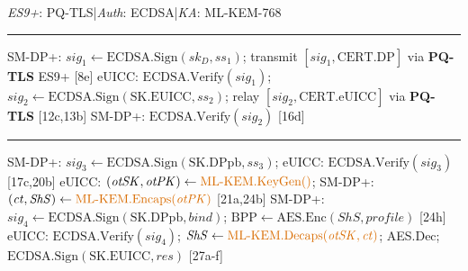 \documentclass[a4paper,fleqn]{cas-sc}
\begin{document}
\begin{algorithm}[H]
\caption{Config (c): ML-KEM-768 key agreement: ECDSA + \textcolor{cfgC}{ML-KEM-768} + \textcolor{cfgB}{PQ-TLS}}
\label{alg:flow-c}
\footnotesize
\begin{algorithmic}[1]
\Statex \textcolor{cfgB}{\textit{ES9+}: PQ-TLS}\enspace|\enspace\textit{Auth}: ECDSA\enspace|\enspace\textcolor{cfgC}{\textit{KA}: ML-KEM-768}
\Statex \rule{0.95\linewidth}{0.2pt}
\State SM-DP+: $\mathit{sig}_1\gets\text{ECDSA.Sign}(\mathit{sk}_D,\mathit{ss}_1)$; transmit $[\mathit{sig}_1,\mathrm{CERT.DP}]$ via \textcolor{cfgB}{\textbf{PQ-TLS}} ES9+ {\color{gray}[8e]}
\State eUICC: $\text{ECDSA.Verify}(\mathit{sig}_1)$; $\mathit{sig}_2\gets\text{ECDSA.Sign}(\mathrm{SK.EUICC},\mathit{ss}_2)$; relay $[\mathit{sig}_2,\mathrm{CERT.eUICC}]$ via \textcolor{cfgB}{\textbf{PQ-TLS}} {\color{gray}[12c,13b]}
\State SM-DP+: $\text{ECDSA.Verify}(\mathit{sig}_2)$ {\color{gray}[16d]}
\Statex \rule{0.95\linewidth}{0.2pt}
\State SM-DP+: $\mathit{sig}_3\gets\text{ECDSA.Sign}(\mathrm{SK.DPpb},\mathit{ss}_3)$; eUICC: $\text{ECDSA.Verify}(\mathit{sig}_3)$ {\color{gray}[17c,20b]}
\State eUICC: $(\mathit{otSK},\mathit{otPK})\gets\textcolor{cfgC}{\text{ML-KEM.KeyGen}()}$; SM-DP+: $(\mathit{ct},\mathit{ShS})\gets\textcolor{cfgC}{\text{ML-KEM.Encaps}(\mathit{otPK})}$ {\color{gray}[21a,24b]}
\State SM-DP+: $\mathit{sig}_4\gets\text{ECDSA.Sign}(\mathrm{SK.DPpb},\mathit{bind})$; $\mathrm{BPP}\gets\text{AES.Enc}(\mathit{ShS},\mathit{profile})$ {\color{gray}[24h]}
\State eUICC: $\text{ECDSA.Verify}(\mathit{sig}_4)$; $\mathit{ShS}\gets\textcolor{cfgC}{\text{ML-KEM.Decaps}(\mathit{otSK},\mathit{ct})}$; AES.Dec; $\text{ECDSA.Sign}(\mathrm{SK.EUICC},\mathit{res})$ {\color{gray}[27a-f]}
\end{algorithmic}
\end{algorithm}
\end{document}
